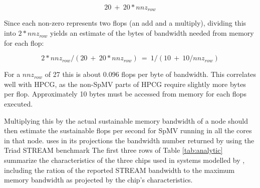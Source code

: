 \begin{equation}\label{eqtn:BytesPerRow}
20~+~20*nnz_{row}
\end{equation}

Since each non-zero represents two flops (an add and a multiply), dividing this into $2*nnz_{row}$ yields an estimate of the bytes of bandwidth needed from memory for each flop:

\begin{equation}\label{eqtn:BytesPerFlop}
2*nnz_{row}/(20~+~20*nnz_{row}) ~=~1/(10~+~10/nnz_{row})
\end{equation}

For a $nnz_{row}$ of 27 this is about 0.096 flops per byte of bandwidth. This correlates well with HPCG, as the non-SpMV parts of HPCG require slightly more bytes per flop. Approximately 10 bytes must be accessed from memory for each flops executed.

Multiplying this by the actual sustainable memory bandwidth of a node should then estimate the sustainable flops per second for SpMV running in all the cores in that node. \cite{techbib:marjanovic2014performance} uses in its projections the bandwidth number returned by using the Triad STREAM benchmark
The first three rows of Table \ref{tab:analytic} summarize the characteristics of the three chips used in systems modelled by \cite{techbib:marjanovic2014performance}, including the ration of the reported STREAM bandwidth to the maximum memory bandwidth as projected by the chip's characteristics.


